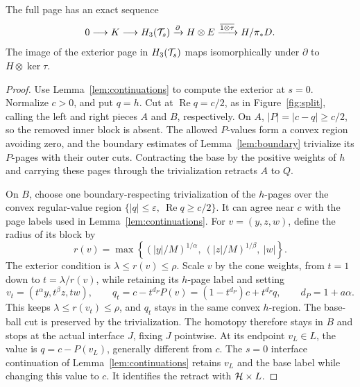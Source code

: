 \begin{lemma}\label{lem:mv}
The full page has an exact sequence
\begin{equation}
0\longrightarrow K\longrightarrow H_3(\mathcal T_s)
\xrightarrow{\partial} H\otimes E
\xrightarrow{\overline{1\otimes\tau}}H/\pi_*D.
\label{eq:tube-13}
\end{equation}
The image of the exterior page in \(H_3(\mathcal T_s)\) maps
isomorphically under \(\partial\) to \(H\otimes\ker\tau\).
\end{lemma}
\begin{proof}
Use Lemma~\ref{lem:continuations} to compute the exterior at \(s=0\).
Normalize \(c>0\), and put \(q=h\). Cut at
\(\operatorname{Re}q=c/2\), as in Figure~\ref{fig:split}, calling
the left and right pieces \(A\) and \(B\), respectively.
On \(A\), \(|P|=|c-q|\ge c/2\), so the removed inner block is
absent. The allowed \(P\)-values form a convex region avoiding zero,
and the boundary estimates of Lemma~\ref{lem:boundary} trivialize
its \(P\)-pages with their outer cuts. Contracting the base by the
positive weights of \(h\) and carrying these pages through the
trivialization retracts \(A\) to \(Q\).

On \(B\), choose one boundary-respecting trivialization of the
\(h\)-pages over the convex regular-value region
\(\{|q|\le\varepsilon,\ \operatorname{Re}q\ge c/2\}\).
It can agree near \(c\) with the page labels used in
Lemma~\ref{lem:continuations}. For \(v=(y,z,w)\), define the
radius of its block by
\[
 r(v)=\max\left\{
 (|y|/M)^{1/\alpha},\ (|z|/M)^{1/\beta},\ |w|
 \right\}.
\]
The exterior condition is \(\lambda\le r(v)\le\rho\).
Scale \(v\) by the cone weights, from \(t=1\) down to
\(t=\lambda/r(v)\), while retaining its \(h\)-page label and setting
\[
 v_t=(t^\alpha y,t^\beta z,tw),\qquad
 q_t=c-t^{d_P}P(v)=(1-t^{d_P})c+t^{d_P}q,
 \qquad d_P=1+a\alpha.
\]
This keeps \(\lambda\le r(v_t)\le\rho\), and \(q_t\) stays in
the same convex \(h\)-region. The base-ball cut is preserved by
the trivialization. The homotopy therefore stays in \(B\) and
stops at the actual interface \(J\), fixing \(J\) pointwise.
At its endpoint \(v_L\in L\), the value is
\(q=c-P(v_L)\), generally different from \(c\).
The \(s=0\) interface continuation of
Lemma~\ref{lem:continuations} retains \(v_L\) and the base label
while changing this value to \(c\). It identifies the retract
with \(\mathcal H\times L\).


\end{proof}

